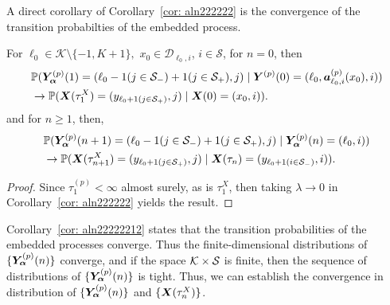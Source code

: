 A direct corollary of Corollary~\ref{cor: aln222222} is the convergence of the transition probabilties of the embedded process. 
\begin{cor}\label{cor: aln22222212} For \(\ell_0\in \mathcal K \setminus \{-1,K+1\},\) \(x_0\in\mathcal D_{\ell_0,i}\), \(i\in\mathcal S\), 
		for \(n=0\), then
		\begin{align}
			&\mathbb P(\bm{Y}_{\bm{\alpha}}^{(p)}(1) = (\ell_0-1(j\in\mathcal{S}_-)+1(j\in\mathcal{S}_+),j) 
					 \mid \boldsymbol Y^{(p)}(0) = (\ell_0,\boldsymbol a_{\ell_0,i}^{(p)}(x_0),i)) \nonumber
			\\&\to  
				\mathbb P(\boldsymbol X(\tau_1^X) = (y_{\ell_0+1(j\in\mathcal{S}_+)}, j)  \mid \boldsymbol X(0) = (x_0,i)).\label{eqn: lim 2}
		\end{align}
		and for \(n\geq 1\), then, 
		\begin{align}
			&\mathbb P(\bm{Y}_{\bm{\alpha}}^{(p)}(n+1) = (\ell_0-1(j\in\mathcal{S}_-)+1(j\in\mathcal{S}_+),j) 
					 \mid \bm{Y}_{\bm{\alpha}}^{(p)}(n) = (\ell_0,i) ) \nonumber
			\\&\to  
				\mathbb P(\boldsymbol X(\tau_{n+1}^X) = (y_{\ell_0+1(j\in\mathcal{S}_+)}, j) \mid \boldsymbol X(\tau_{n}) = (y_{\ell_0+1(i\in\mathcal{S}_-)},i) ).\label{eqn: ddddddd2}
		\end{align}
\end{cor}
\begin{proof}
	Since \(\tau_1^{(p)}<\infty\) almost surely, as is \(\tau_1^X\), then taking \(\lambda \to 0\) in Corollary~\ref{cor: aln222222} yields the result. 
\end{proof}
Corollary~\ref{cor: aln22222212} states that the transition probabilities of the embedded processes converge. Thus the finite-dimensional distributions of \(\{\bm{Y}_{\bm{\alpha}}^{(p)}(n)\}\) converge, and if the space \(\mathcal K\times \mathcal{S}\) is finite, then the sequence of distributions of \(\{\bm{Y}_{\bm{\alpha}}^{(p)}(n)\}\) is tight. Thus, we can establish the convergence in distribution of \(\{\bm{Y}_{\bm{\alpha}}^{(p)}(n)\}\) and \(\{\boldsymbol X(\tau_n^X)\}\). 

